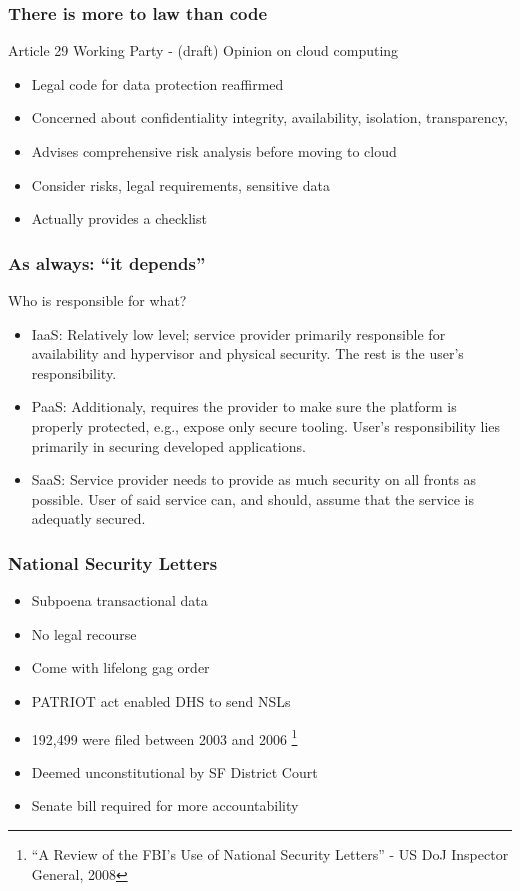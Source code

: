 \documentclass{beamer}
\begin{document}
\begin{frame}
    \frametitle{There is more to law than code}
    Article 29 Working Party - (draft) Opinion on cloud computing
    \begin{itemize}
    \item Legal code for data protection reaffirmed
    \item Concerned about confidentiality integrity, availability, isolation, transparency, 
    \item Advises comprehensive risk analysis before moving to cloud
    \item Consider risks, legal requirements, sensitive data
    \item Actually provides a checklist
    \end{itemize}
\end{frame}

\begin{frame}
    \frametitle{As always: ``it depends''}
    Who is responsible for what?
    \begin{itemize}
        \item<1> IaaS:
            Relatively low level; service provider primarily responsible for availability
            and hypervisor and physical security. The rest is the user's
            responsibility.
        \item<2> PaaS:
            Additionaly, requires the provider to make sure the platform is
            properly protected, e.g., expose only secure tooling. User's
            responsibility lies primarily in securing developed applications.
        \item<3> SaaS:
            Service provider needs to provide as much security on all fronts as
            possible. User of said service can, and should, assume that the
            service is adequatly secured.
    \end{itemize}
\end{frame}

\begin{frame}
    \frametitle{National Security Letters}
    \begin{itemize}
    \item Subpoena transactional data
    \item No legal recourse
    \item Come with lifelong gag order
    \item PATRIOT act enabled DHS to send NSLs
    \item 192,499 were filed between 2003 and 2006 \footnote{``A Review of the FBI's Use of National Security Letters'' - US DoJ Inspector General, 2008}
    \item Deemed unconstitutional by SF District Court
    \item Senate bill required for more accountability
    \end{itemize}
\end{frame}
\end{document}
